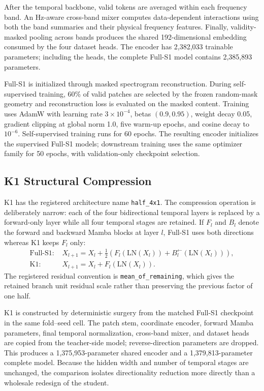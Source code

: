 After the temporal backbone, valid tokens are averaged within each frequency band. An Hz-aware cross-band mixer computes data-dependent interactions using both the band summaries and their physical frequency features. Finally, validity-masked pooling across bands produces the shared 192-dimensional embedding consumed by the four dataset heads. The encoder has 2,382,033 trainable parameters; including the heads, the complete Full-S1 model contains 2,385,893 parameters.

Full-S1 is initialized through masked spectrogram reconstruction. During self-supervised training, 60\% of valid patches are selected by the frozen random-mask geometry and reconstruction loss is evaluated on the masked content. Training uses AdamW with learning rate $3\times10^{-4}$, betas $(0.9,0.95)$, weight decay 0.05, gradient clipping at global norm 1.0, five warm-up epochs, and cosine decay to $10^{-6}$. Self-supervised training runs for 60 epochs. The resulting encoder initializes the supervised Full-S1 models; downstream training uses the same optimizer family for 50 epochs, with validation-only checkpoint selection.

\subsection{K1 Structural Compression}
\label{subsec:k1}

K1 has the registered architecture name \texttt{half\_4x1}. The compression operation is deliberately narrow: each of the four bidirectional temporal layers is replaced by a forward-only layer while all four temporal stages are retained. If $F_l$ and $B_l$ denote the forward and backward Mamba blocks at layer $l$, Full-S1 uses both directions whereas K1 keeps $F_l$ only:
\begin{align}
  \text{Full-S1: } & X_{l+1}=X_l+\tfrac{1}{2}\left(F_l(\mathrm{LN}(X_l))+B_l^{\leftarrow}(\mathrm{LN}(X_l))\right), \\
  \text{K1: } & X_{l+1}=X_l+F_l(\mathrm{LN}(X_l)).
\end{align}
The registered residual convention is \texttt{mean\_of\_remaining}, which gives the retained branch unit residual scale rather than preserving the previous factor of one half.

K1 is constructed by deterministic surgery from the matched Full-S1 checkpoint in the same fold--seed cell. The patch stem, coordinate encoder, forward Mamba parameters, final temporal normalization, cross-band mixer, and dataset heads are copied from the teacher-side model; reverse-direction parameters are dropped. This produces a 1,375,953-parameter shared encoder and a 1,379,813-parameter complete model. Because the hidden width and number of temporal stages are unchanged, the comparison isolates directionality reduction more directly than a wholesale redesign of the student.

